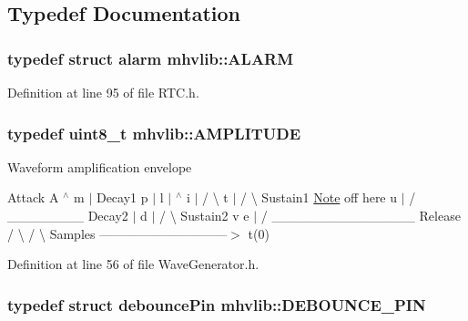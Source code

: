 \subsection{Typedef Documentation}
\hypertarget{namespacemhvlib_a3fa96bbaa152dfe112dd50663d5caef5}{
\subsubsection[{A\-L\-A\-R\-M}]{\setlength{\rightskip}{0pt plus 5cm}typedef struct {\bf alarm} {\bf mhvlib\-::\-A\-L\-A\-R\-M}}}\label{namespacemhvlib_a3fa96bbaa152dfe112dd50663d5caef5}


Definition at line 95 of file R\-T\-C.\-h.

\hypertarget{namespacemhvlib_a15ca117fe572109e56c947a4c6612e7e}{
\subsubsection[{A\-M\-P\-L\-I\-T\-U\-D\-E}]{\setlength{\rightskip}{0pt plus 5cm}typedef uint8\-\_\-t {\bf mhvlib\-::\-A\-M\-P\-L\-I\-T\-U\-D\-E}}}\label{namespacemhvlib_a15ca117fe572109e56c947a4c6612e7e}
Waveform amplification envelope

Attack A $^\wedge$ m $|$ Decay1 p $|$ l $|$ $^\wedge$ i $|$ / \textbackslash{} t $|$ / \textbackslash{} Sustain1 \hyperlink{structmhvlib_1_1_note}{Note} off here u $|$ / \-\_\-\-\_\-\-\_\-\-\_\-\-\_\-\-\_\-\-\_\-\-\_\- Decay2 $|$ d $|$ / \textbackslash{} Sustain2 v e $|$ / \-\_\-\-\_\-\-\_\-\-\_\-\-\_\-\-\_\-\-\_\-\-\_\-\-\_\-\-\_\-\-\_\-\-\_\-\-\_\-\-\_\-\-\_\- Release / \textbackslash{} / \textbackslash{} Samples ------------------------------$>$ t(0) 

Definition at line 56 of file Wave\-Generator.\-h.

\hypertarget{namespacemhvlib_a290c64687661f8a9ffaa662db0052f63}{
\subsubsection[{D\-E\-B\-O\-U\-N\-C\-E\-\_\-\-P\-I\-N}]{\setlength{\rightskip}{0pt plus 5cm}typedef struct {\bf debounce\-Pin} {\bf mhvlib\-::\-D\-E\-B\-O\-U\-N\-C\-E\-\_\-\-P\-I\-N}}}\label{namespacemhvlib_a290c64687661f8a9ffaa662db0052f63}


